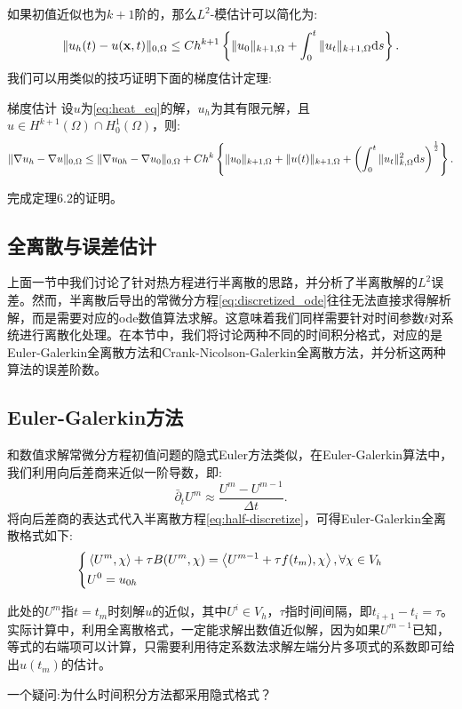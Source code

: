 如果初值近似也为$k+1$阶的，那么$L^{2}$-模估计可以简化为:
\begin{equation}
    \|u_{h}(t)-u(\mathbf{x},t)\|_{0,\Omega}\le Ch^{k+1}\left\{
        \|u_{0}\|_{k+1,\Omega}+\int_{0}^{t}\|u_{t}\|_{k+1,\Omega}\mathrm{d} s
    \right\}.
\end{equation}
我们可以用类似的技巧证明下面的梯度估计定理:
\begin{theorem}{梯度估计}
    设$u$为\eqref{eq:heat_eq}的解，$u_{h}$为其有限元解，且$u\in H^{k+1}(\Omega)\cap H_{0}^{1}(\Omega)$，则:
    \begin{equation}
        \|\nabla u_{h}-\nabla u\|_{0,\Omega}\le\|\nabla u_{0h}-\nabla u_{0}\|_{0,\Omega}+Ch^{k}\left\{\|u_{0}\|_{k+1,\Omega}+\|u(t)\|_{k+1,\Omega}+\left(\int_{0}^{t}\|u_{t}\|_{k,\Omega}^{2}\mathrm{d} s\right)^{\frac{1}{2}}\right\}.
    \end{equation}
\end{theorem}
\begin{exercise}
    完成定理6.2的证明。
\end{exercise}
\subsection{全离散与误差估计}
上面一节中我们讨论了针对热方程进行半离散的思路，并分析了半离散解的$L^{2}$误差。然而，半离散后导出的常微分方程\eqref{eq:discretized_ode}往往无法直接求得解析解，而是需要对应的ode数值算法求解。这意味着我们同样需要针对时间参数$t$对系统进行离散化处理。在本节中，我们将讨论两种不同的时间积分格式，对应的是Euler-Galerkin全离散方法和Crank-Nicolson-Galerkin全离散方法，并分析这两种算法的误差阶数。
\subsection{Euler-Galerkin方法}
和数值求解常微分方程初值问题的隐式Euler方法类似，在Euler-Galerkin算法中，我们利用向后差商来近似一阶导数，即:
\begin{equation}
    \bar{\partial}_{t}U^{m}\approx\frac{U^{m}-U^{m-1}}{\Delta t}.
\end{equation}
将向后差商的表达式代入半离散方程\eqref{eq:half-discretize}，可得Euler-Galerkin全离散格式如下:
\begin{equation}
    \left\{
        \begin{aligned}
            &\left<U^{m},\chi\right>+\tau B(U^{m},\chi)=\left<U^{m-1}+\tau f(t_{m}),\chi\right>,\forall \chi\in V_{h}\\
            &U^{0}=u_{0h}\\
        \end{aligned}
    \right.
\end{equation}
\begin{remark}
    此处的$U^{m}$指$t=t_{m}$时刻解$u$的近似，其中$U^{i}\in V_{h}$，$\tau$指时间间隔，即$t_{i+1}-t_{i}=\tau$。实际计算中，利用全离散格式，一定能求解出数值近似解，因为如果$U^{m-1}$已知，等式的右端项可以计算，只需要利用待定系数法求解左端分片多项式的系数即可给出$u(t_{m})$的估计。
\end{remark}
\begin{remark}
    一个疑问:为什么时间积分方法都采用隐式格式？
\end{remark}
